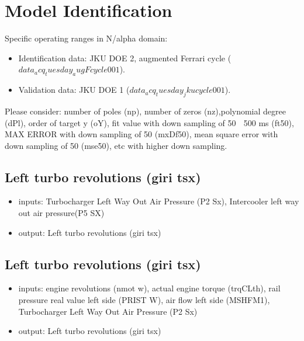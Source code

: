 
\section{Model Identification}
\label{sec:modelidentification}

Specific operating ranges  in N/alpha domain:
\begin{itemize}
	\item{Identification data: JKU DOE 2, augmented Ferrari cycle ($data_acq_tuesday_augFcycle001$).}
	\item{Validation data: JKU DOE 1 ($data_acq_tuesday_jkucycle001$).}
\end{itemize}

Please consider: number of poles (np), number of zeros (nz),polynomial degree (dPl), order of target y (oY), fit value with down sampling of 50  500 ms (ft50), MAX ERROR with down sampling of 50  (mxDf50), mean square error with down sampling of 50 (mse50), etc with higher down sampling.

\subsection{Left turbo revolutions (giri tsx)}
\begin{itemize}
	\item{inputs: Turbocharger Left Way Out Air Pressure (P2 Sx), Intercooler left way out air pressure(P5 SX)}
	\item{output: Left turbo revolutions (giri tsx)}
\end{itemize}	



\subsection{Left turbo revolutions (giri tsx)}
\begin{itemize}
	\item{inputs: engine revolutions (nmot w), actual engine torque (trqCLth), rail pressure real value left side (PRIST W), air flow left side (MSHFM1), Turbocharger Left Way Out Air Pressure (P2 Sx)}
	\item{output: Left turbo revolutions (giri tsx)}
\end{itemize}	

